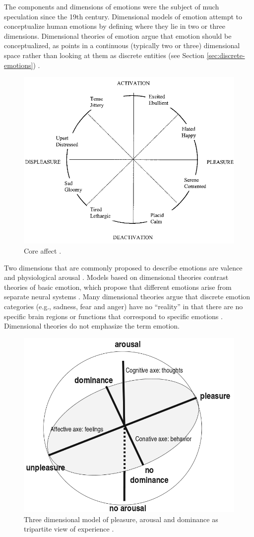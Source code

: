 \documentclass[11pt]{article}
\begin{document}
The components and dimensions of emotions were the subject of much speculation
since the 19th century. Dimensional models of emotion attempt to conceptualize
human emotions by defining where they lie in two or three dimensions.
Dimensional theories of emotion argue that emotion should be conceptualized, as
points in a continuous (typically two or three) dimensional space rather than
looking at them as discrete entities (see Section \ref{sec:discrete-emotions})
\cite{carver:affect-behavior} \cite{mehrabian-russell:pad}
\cite{russell:core-affect} \cite{watson:consensual-structure-mood}. 

\begin{figure}[tbh]
  \center
  \includegraphics[width=.7\textwidth]{figure/core-affect.png}
  \caption{Core affect \cite{russell:core-affect}.}
  \label{fig:core-affect}
\end{figure}

Two dimensions that are commonly proposed to describe emotions are valence and
physiological arousal \cite{arnold:emotion-personality}
\cite{lazarus:cognitive-theory-emotion} \cite{russell:circumplex-affect}. Models
based on dimensional theories contrast theories of basic emotion, which propose
that different emotions arise from separate neural systems
\cite{posner:circumplex-affect}. Many dimensional theories argue that discrete
emotion categories (e.g., sadness, fear and anger) have no ``reality'' in that
there are no specific brain regions or functions that correspond to specific
emotions \cite{barrett:emotions-natural}. Dimensional theories do not emphasize
the term emotion.

\begin{figure}[tbh]
  \center
  \includegraphics[width=.6\textwidth]{figure/dimensional2.png}
  \caption{Three dimensional model of pleasure, arousal and dominance as
  tripartite view of experience \cite{mehrabian:pad}.}
  \label{fig:pad}
\end{figure}
\end{document}
